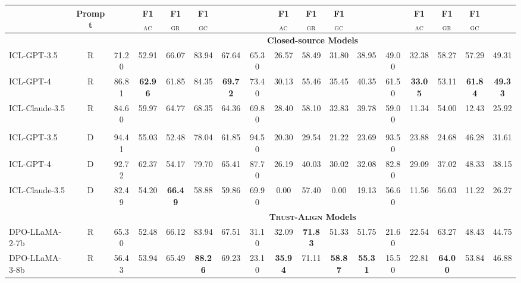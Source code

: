 \documentclass{article} %
\newcommand{\method}[0]{\textsc{Trust-Align}}
\begin{document}
\begin{table}[ht!]
{\begin{tabular}{l*{16}{c}}
\cmidrule(lr){4-5}\cmidrule(lr){6-6}\cmidrule(lr){9-10}\cmidrule(lr){11-11}\cmidrule(lr){14-15}\cmidrule(lr){16-16}

& \bf Prompt & & \textbf{F1$_{\text{AC}}$} & \textbf{F1$_{\text{GR}}$} & \textbf{F1$_{\text{GC}}$} & \textbf{} & & \textbf{F1$_{\text{AC}}$} & \textbf{F1$_{\text{GR}}$} & \textbf{F1$_{\text{GC}}$} & \textbf{} & & \textbf{F1$_{\text{AC}}$} & \textbf{F1$_{\text{GR}}$} & \textbf{F1$_{\text{GC}}$} & \textbf{} \\
\midrule
& & \multicolumn{15}{c}{\cellcolor[gray]{0.9}\textbf{Closed-source Models}} \\
ICL-GPT-3.5  & R & 71.20 & 52.91 & 66.07 & 83.94 & 67.64 & 65.30 & 26.57 & 58.49 & 31.80 & 38.95 & 49.00 & 32.38 & 58.27 & 57.29 & 49.31 \\
ICL-GPT-4  & R & 86.81 & \bf{62.96} & 61.85 & 84.35 & \bf{69.72} & 73.40 & 30.13 & 55.46 & 35.45 & 40.35 & 61.50 & \bf{33.05} & 53.11 & \bf{61.84} & \bf{49.33} \\  
ICL-Claude-3.5 & R & 84.60 & 59.97 & 64.77 & 68.35 & 64.36 & 69.80 & 28.40 & 58.10 & 32.83 & 39.78 & 59.00 & 11.34 & 54.00 & 12.43 & 25.92 \\\\

ICL-GPT-3.5  & D & 94.41 & 55.03 & 52.48 & 78.04 & 61.85 & 94.50 & 20.30 & 29.54 & 21.22 & 23.69 & 93.50 & 23.88 & 24.68 & 46.28 & 31.61 \\
ICL-GPT-4   & D & 92.72 & 62.37 & 54.17 & 79.70 & 65.41 & 87.70 & 26.19 & 40.03 & 30.02 & 32.08 & 82.80 & 29.09 & 37.02 & 48.33 & 38.15 \\ 
ICL-Claude-3.5 & D & 82.49 & 54.20 & \bf{66.49} & 58.88 & 59.86 & 69.90 & 0.00 & 57.40 & 0.00 & 19.13 & 56.60 & 11.56 & 56.03 & 11.22 & 26.27 \\

& & \multicolumn{15}{c}{\cellcolor[gray]{0.9}\textbf{\method{} Models}} \\
DPO-LLaMA-2-7b & R & 65.30 & 52.48 & 66.12 & 83.94 & 67.51 & 31.10 & 32.09 & \bf{71.83} & 51.33 & 51.75 & 21.60 & 22.54 & 63.27 & 48.43 & 44.75 \\
DPO-LLaMA-3-8b & R & 56.43 & 53.94 & 65.49 & \bf{88.26} & 69.23 & 23.10 & \bf{35.94} & 71.11 & \bf{58.87} & \bf 55.31 & 15.50 & 22.81 & \bf{64.00} & 53.84 & 46.88 \\

\bottomrule
\end{tabular}
}
\end{table}
\end{document}

